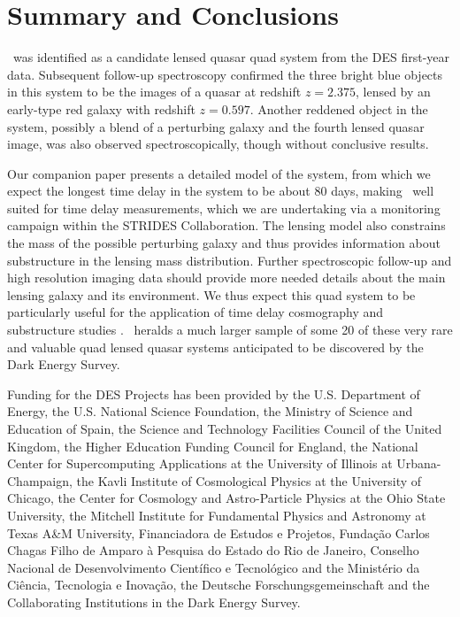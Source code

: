 \documentclass[twocolumn]{aastex6}
\begin{document}
\section{Summary and Conclusions}\label{sec:conclusions}

\sysname\ was identified as a candidate lensed quasar quad system from the DES first-year
data.  Subsequent follow-up spectroscopy confirmed the three bright blue objects in
this system to be the images of a quasar at redshift $z = 2.375$, lensed by an early-type
red galaxy with redshift $z = 0.597$.
Another reddened object in the system, possibly a blend of a perturbing galaxy and the fourth 
lensed quasar image, was also observed spectroscopically, 
though without conclusive results.

Our companion paper \cite{agn17} presents a detailed model of the system, from which we
expect the longest time delay in the system to be about 80 days, making \sysname\ well
suited \citep{tm16} for time delay measurements, which we are undertaking via a 
monitoring campaign within the STRIDES Collaboration.  
The lensing model also constrains the mass of the 
possible perturbing galaxy and thus provides information about substructure in the
lensing mass distribution.
Further spectroscopic follow-up and high resolution imaging data should provide more 
needed details about the main lensing galaxy and its environment.
We thus expect this quad system to be particularly useful for the application 
of time delay cosmography \citep[e.g.][]{tm16} and substructure studies 
\citep[e.g.,][]{dk02}.
\sysname\ heralds a much larger sample of some 20 of these very rare and
valuable quad lensed quasar systems anticipated to be discovered by the Dark Energy Survey.


\acknowledgments

Funding for the DES Projects has been provided by the U.S. Department of Energy, the U.S. National Science Foundation, the Ministry of Science and Education of Spain, 
the Science and Technology Facilities Council of the United Kingdom, the Higher Education Funding Council for England, the National Center for Supercomputing 
Applications at the University of Illinois at Urbana-Champaign, the Kavli Institute of Cosmological Physics at the University of Chicago, 
the Center for Cosmology and Astro-Particle Physics at the Ohio State University,
the Mitchell Institute for Fundamental Physics and Astronomy at Texas A\&M University, Financiadora de Estudos e Projetos, 
Funda{\c c}{\~a}o Carlos Chagas Filho de Amparo {\`a} Pesquisa do Estado do Rio de Janeiro, Conselho Nacional de Desenvolvimento Cient{\'i}fico e Tecnol{\'o}gico and 
the Minist{\'e}rio da Ci{\^e}ncia, Tecnologia e Inova{\c c}{\~a}o, the Deutsche Forschungsgemeinschaft and the Collaborating Institutions in the Dark Energy Survey.
\end{document}
